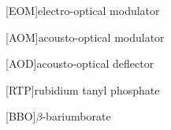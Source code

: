 [EOM]{electro-optical modulator}

[AOM]{acousto-optical modulator}

[AOD]{acousto-optical deflector}

[RTP]{rubidium tanyl phosphate}

[BBO]{$\beta$-bariumborate}

